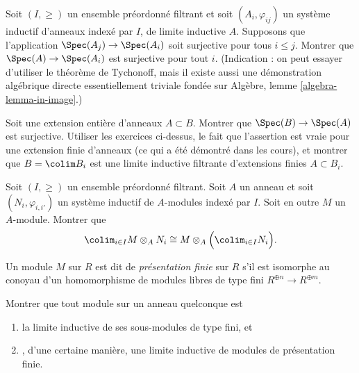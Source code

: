 \begin{exercise}
\label{exercise-colimit-surjective}
Soit $(I, \geq)$ un ensemble préordonné filtrant et soit
$(A_i, \varphi_{ij})$ un système inductif d'anneaux indexé par $I$, de limite inductive
$A$. Supposons que l'application $\Spec(A_j) \to \Spec(A_i)$ soit
surjective pour tous $i \leq j$. Montrer que
$\Spec(A) \to \Spec(A_i)$ est surjective pour tout $i$.
(Indication : on peut essayer d'utiliser le théorème de Tychonoff, mais il existe aussi une
démonstration algébrique directe essentiellement triviale fondée sur
Algèbre, lemme \ref{algebra-lemma-in-image}.)
\end{exercise}

\begin{exercise}
\label{exercise-integral-colimit-finite}
Soit une extension entière d'anneaux $A \subset B$. Montrer que
$\Spec(B) \to \Spec(A)$ est surjective.
Utiliser les exercices ci-dessus, le fait que l'assertion est vraie pour une extension finie
d'anneaux (ce qui a été démontré dans les cours), et montrer que
$B = \colim B_i$ est une limite inductive filtrante d'extensions finies $A \subset B_i$.
\end{exercise}

\begin{exercise}
\label{exercise-colimit-tensor}
Soit $(I, \geq)$ un ensemble préordonné filtrant.
Soit $A$ un anneau et soit $(N_i, \varphi_{i, i'})$ un système inductif de
$A$-modules indexé par $I$. Soit en outre $M$ un $A$-module. Montrer
que
$$
\colim_{i\in I} M \otimes_A N_i\cong
M \otimes_A \Big( \colim_{i\in I} N_i\Big).
$$
\end{exercise}

\begin{definition}
\label{definition-finite-presentation}
Un module $M$ sur $R$ est dit de {\it présentation finie} sur
$R$ s'il est isomorphe au conoyau d'un homomorphisme de modules libres de type fini
$ R^{\oplus n} \to R^{\oplus m}$.
\end{definition}

\begin{exercise}
\label{exercise-colimit-modules}
Montrer que tout module sur un anneau quelconque est
\begin{enumerate}
\item la limite inductive de ses sous-modules de type fini, et
\item, d'une certaine manière, une limite inductive de modules de présentation finie.
\end{enumerate}
\end{exercise}





